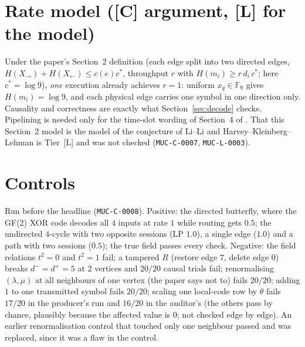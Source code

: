 \documentclass[10pt]{article}
\newcommand{\tier}[1]{\textsf{[#1]}}
\newcommand{\tL}{\tier{L}}
\newcommand{\tC}{\tier{C}}
\newcommand{\F}{\mathbb F}
\begin{document}
\section{Rate model (\tC{} argument, \tL{} for the model)}\label{sec:rate}
Under the paper's Section~2 definition (each edge split into two directed edges, $H(X_\to)+H(X_\leftarrow)\le c(e)c^*$, throughput $r$ with $H(m_i)\ge r\,d_i\,c^*$; here $c^*=\log9$), \emph{one} execution already achieves $r=1$: uniform $x_q\in\F_9$ gives $H(m_i)=\log9$, and each physical edge carries one symbol in one direction only. Causality and correctness are exactly what Section~\ref{sec:decode} checks. Pipelining is needed only for the time-slot wording of Section~4 of \cite{bh}. That this Section~2 model is the model of the conjecture of Li--Li and Harvey--Kleinberg--Lehman is Tier~\tL{} and was not checked (\texttt{MUC-C-0007}, \texttt{MUC-L-0003}).

\section{Controls}\label{sec:ctrl}
Run before the headline (\texttt{MUC-C-0008}). Positive: the directed butterfly, where the GF(2) XOR code decodes all $4$ inputs at rate $1$ while routing gets $0.5$; the undirected $4$-cycle with two opposite sessions (LP $1.0$), a single edge ($1.0$) and a path with two sessions ($0.5$); the true field passes every check. Negative: the field relations $t^2=0$ and $t^2=1$ fail; a tampered $R$ (restore edge $7$, delete edge $0$) breaks $d^-=d^+=5$ at $2$ vertices and $20/20$ causal trials fail; renormalising $(\lambda,\mu)$ at all neighbours of one vertex (the paper says not to) fails $20/20$; adding $1$ to one transmitted symbol fails $20/20$; scaling one local-code row by $\theta$ fails $17/20$ in the producer's run and $16/20$ in the auditor's (the others pass by chance, plausibly because the affected value is $0$; not checked edge by edge). An earlier renormalisation control that touched only one neighbour passed and was replaced, since it was a flaw in the control.
\end{document}
